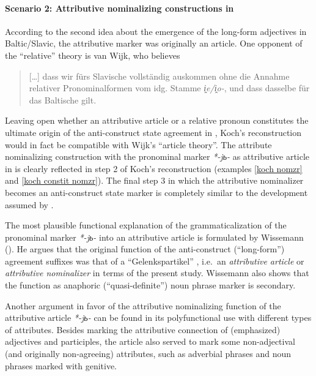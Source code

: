 \paragraph{Scenario 2: Attributive nominalizing constructions in } 
According to the second idea about the emergence of the long-form adjectives in Baltic\slash{}Slavic, the attributive marker was originally an article. One opponent of the “relative” theory is van Wijk, who believes 
\begin{quote}
[\dots] dass wir fürs Slavische vollständig auskommen ohne die Annahme relativer Pronominalformen vom idg. Stamme \textit{i̭e/i̭o-}, und dass dasselbe für das Baltische gilt. \citep[28]{wijk1935}%
\end{quote}
Leaving open whether an attributive article or a relative pronoun constitutes the ultimate origin of the anti\hyp{}construct state agreement in , Koch's reconstruction would in fact be compatible with Wijk's “article theory”. The attribute nominalizing construction with the pronominal marker \textit{*-jь-} as attributive article in  is clearly reflected in step 2 of Koch's reconstruction (examples \ref{koch nomzr} and \ref{koch constit nomzr}). The final step 3 in which the attributive nominalizer becomes an anti\hyp{}construct state marker is completely similar to the development assumed by \cite{wijk1935}.

The most plausible functional explanation of the grammaticalization of the pronominal marker \textit{*-jь-} into an attributive article is formulated by Wissemann (\citeyear{wissemann1958}). He argues that the original function of the anti\hyp{}construct (“long-form”) agreement suffixes was that of a “Gelenkspartikel” \citep[76]{wissemann1958}, i.e.~an \textit{attributive article} or \textit{attributive nominalizer} in terms of the present study. Wissemann also shows that the function as anaphoric (“quasi-definite”) noun phrase marker is secondary.

Another argument in favor of the attributive nominalizing function of the  attributive article \textit{*-jь-} can be found in its polyfunctional use with different types of attributes. Besides marking the attributive connection of (emphasized) adjectives and participles, the article also served to mark some non-adjectival (and originally non-agreeing) attributes, such as adverbial phrases and noun phrases marked with genitive.

